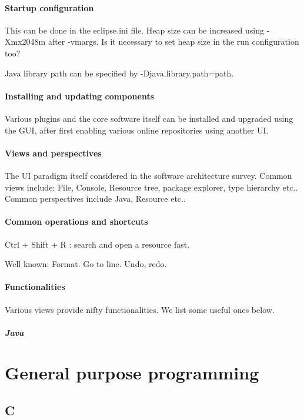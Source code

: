 \documentclass[oneside, article]{memoir}
\begin{document}
\subsection{Startup configuration}
This can be done in the eclipse.ini file. Heap size can be increased using -Xmx2048m after -vmargs. \chk Is it necessary to set heap size in the run configuration too?

Java library path can be specified by -Djava.library.path=path.

\subsection{Installing and updating components}
Various plugins and the core software itself can be installed and upgraded using the GUI, after first enabling various online repositories using another UI.

\subsection{Views and perspectives}
The UI paradigm itself considered in the software architecture survey. Common views include: File, Console, Resource tree, package explorer, type hierarchy etc.. Common perspectives include Java, Resource etc..

\subsection{Common operations and shortcuts}
Ctrl + Shift + R : search and open a resource fast.

Well known: Format. Go to line. Undo, redo.

\subsection{Functionalities}
Various views provide nifty functionalities. We list some useful ones below.

\subsubsection{Java}
\tbc

\part{General purpose programming}
\chapter{C}
\end{document}
